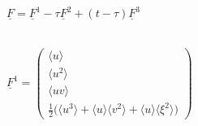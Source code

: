\documentclass[
	pdftex,             %
	12pt,				%
	a4paper,		   	%
	english,				%
	oneside,			%
]{article}
\newcommand{\mom}[1]{\langle #1 \rangle}
\newcommand{\uu}[1]{\underline{#1}}
\begin{document}
~\\

\begin{math}
\uu{F} = \uu{F}^1 - \tau \uu{F}^2 + (t - \tau) \uu{F}^3
\end{math}

~\\

\begin{math}
\uu{F}^1 =
\begin{pmatrix}
\mom{u} \\ 
\mom{u^2} \\ 
\mom{uv} \\ 
\frac{1}{2} \big(\mom{u^3} + \mom{u}\mom{v^2} + \mom{u}\mom{\xi^2} \big)
\end{pmatrix}
\end{math}

~\\
\end{document}
